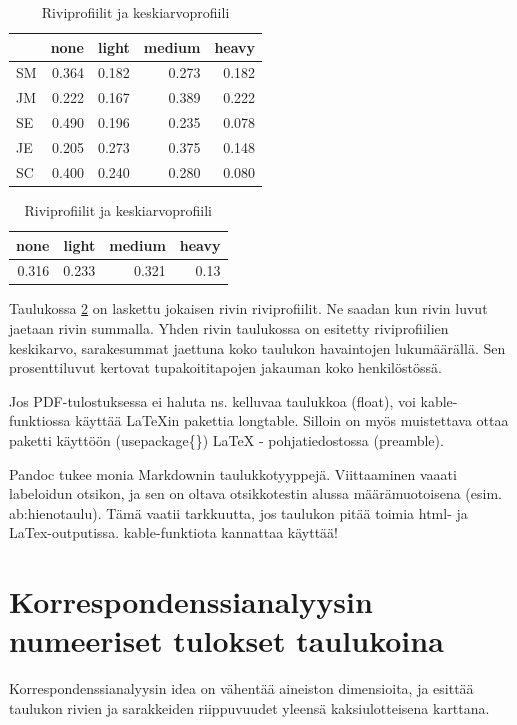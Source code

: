 \documentclass[finnish,]{book}
\theoremstyle{definition}
\theoremstyle{definition}
\theoremstyle{definition}
\theoremstyle{remark}
\begin{document}
\begin{table}
\caption{\label{tab:smoketable2}Riviprofiilit ja keskiarvoprofiili}

\centering
\begin{tabular}[t]{lrrrr}
\toprule
  & none & light & medium & heavy\\
\midrule
SM & 0.364 & 0.182 & 0.273 & 0.182\\
JM & 0.222 & 0.167 & 0.389 & 0.222\\
SE & 0.490 & 0.196 & 0.235 & 0.078\\
JE & 0.205 & 0.273 & 0.375 & 0.148\\
SC & 0.400 & 0.240 & 0.280 & 0.080\\
\bottomrule
\end{tabular}
\centering
\begin{tabular}[t]{rrrr}
\toprule
none & light & medium & heavy\\
\midrule
0.316 & 0.233 & 0.321 & 0.13\\
\bottomrule
\end{tabular}
\end{table}

Taulukossa \ref{tab:smoketable2} on laskettu jokaisen rivin
riviprofiilit. Ne saadan kun rivin luvut jaetaan rivin summalla. Yhden
rivin taulukossa on esitetty riviprofiilien keskikarvo, sarakesummat
jaettuna koko taulukon havaintojen lukumäärällä. Sen prosenttiluvut
kertovat tupakoititapojen jakauman koko henkilöstössä.

Jos PDF-tulostuksessa ei haluta ns. kelluvaa taulukkoa (float), voi
kable-funktiossa käyttää LaTeXin pakettia longtable. Silloin on myös
muistettava ottaa paketti käyttöön (usepackage\{\}) LaTeX -
pohjatiedostossa (preamble).

Pandoc tukee monia Markdownin taulukkotyyppejä. Viittaaminen vaaati
labeloidun otsikon, ja sen on oltava otsikkotestin alussa
määrämuotoisena (esim. ab:hienotaulu). Tämä vaatii tarkkuutta, jos
taulukon pitää toimia html- ja LaTex-outputissa. kable-funktiota
kannattaa käyttää!

\hypertarget{korrespondenssianalyysin-numeeriset-tulokset-taulukoina}{%
\section{Korrespondenssianalyysin numeeriset tulokset
taulukoina}\label{korrespondenssianalyysin-numeeriset-tulokset-taulukoina}}

Korrespondenssianalyysin idea on vähentää aineiston dimensioita, ja
esittää taulukon rivien ja sarakkeiden riippuvuudet yleensä
kaksiulotteisena karttana.
\end{document}

